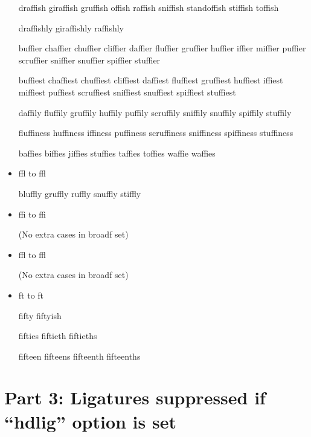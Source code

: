 \begin{itemize}
draffish giraffish gruffish offish raffish sniffish standoffish stiffish toffish

draffishly giraffishly raffishly

buffier chaffier chuffier cliffier daffier fluffier gruffier huffier iffier miffier puffier scruffier sniffier snuffier spiffier stuffier

buffiest chaffiest chuffiest cliffiest daffiest fluffiest gruffiest huffiest iffiest miffiest puffiest scruffiest sniffiest snuffiest spiffiest stuffiest

daffily fluffily gruffily huffily puffily scruffily sniffily snuffily spiffily stuffily

fluffiness huffiness iffiness puffiness scruffiness sniffiness spiffiness stuffiness

baffies biffies jiffies stuffies taffies toffies waffie waffies


\item ffl to ff\hspace{0pt}l

bluffly gruffly ruffly snuffly stiffly


\item ffi to f\hspace{0pt}fi

(No extra cases in broadf set)


\item ffl to f\hspace{0pt}fl

(No extra cases in broadf set)


\item ft to f\hspace{0pt}t

fifty fiftyish

fifties fiftieth fiftieths

fifteen fifteens fifteenth fifteenths



\end{itemize}


\section*{Part 3: Ligatures suppressed if ``hdlig'' option is set}

